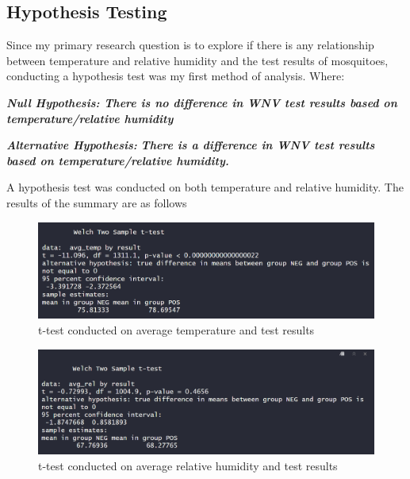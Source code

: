 \documentclass[
  letterpaper,
  DIV=11,
  numbers=noendperiod]{scrartcl}
\begin{document}
\hypertarget{hypothesis-testing}{%
\subsection{Hypothesis Testing}\label{hypothesis-testing}}

Since my primary research question is to explore if there is any
relationship between temperature and relative humidity and the test
results of mosquitoes, conducting a hypothesis test was my first method
of analysis. Where:

\textbf{\emph{Null Hypothesis: There is no difference in WNV test
results based on temperature/relative humidity}}

\textbf{\emph{Alternative Hypothesis:}} \textbf{\emph{There is a
difference in WNV test results based on temperature/relative humidity.}}

A hypothesis test was conducted on both temperature and relative
humidity. The results of the summary are as follows

\begin{figure}

{\centering \includegraphics{images/Screenshot 2023-12-15 162119.png}

}

\caption{t-test conducted on average temperature and test results}

\end{figure}

\begin{figure}

{\centering \includegraphics{images/Screenshot 2023-12-15 162220.png}

}

\caption{t-test conducted on average relative humidity and test results}

\end{figure}
\end{document}

